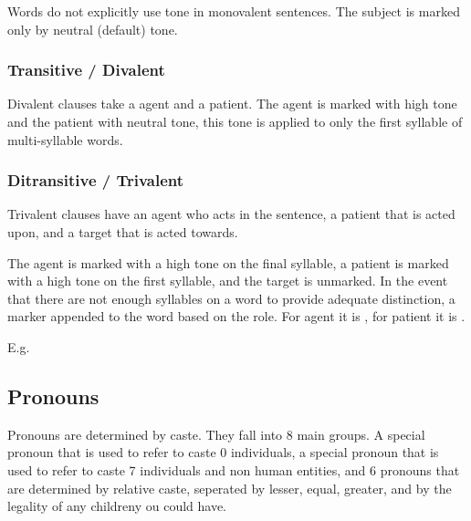 Words do not explicitly use tone in monovalent sentences. The subject is marked only by neutral (default) tone.

\subsubsection{Transitive / Divalent}

Divalent clauses take a agent and a patient. The agent is marked with high tone and the patient with neutral tone, this tone is applied to only the first syllable of multi-syllable words.

\subsubsection{Ditransitive / Trivalent}

Trivalent clauses have an agent who acts in the sentence, a patient that is acted upon, and a target that is acted towards.

The agent is marked with a high tone on the final syllable, a patient is marked with a high tone on the first syllable, and the target is unmarked. In the event that there are not enough syllables on a word to provide adequate distinction, a marker appended to the word based on the role. For agent it is  , for patient it is  .

E.g.




\subsection{Pronouns}

Pronouns are determined by caste. They fall into 8 main groups. A special pronoun that is used to refer to caste 0 individuals, a special pronoun that is used to refer to caste 7 individuals and non human entities, and 6 pronouns that are determined by relative caste, seperated by lesser, equal, greater, and by the legality of any childreny ou could have.

